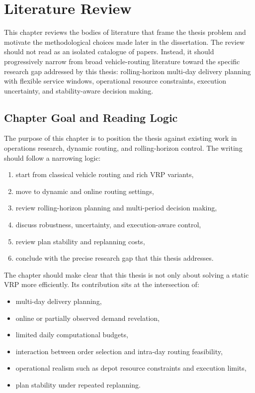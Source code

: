 \chapter{Literature Review}
\label{chap:literature_review}

This chapter reviews the bodies of literature that frame the thesis problem and motivate the methodological choices made later in the dissertation. The review should not read as an isolated catalogue of papers. Instead, it should progressively narrow from broad vehicle-routing literature toward the specific research gap addressed by this thesis: rolling-horizon multi-day delivery planning with flexible service windows, operational resource constraints, execution uncertainty, and stability-aware decision making.

\section{Chapter Goal and Reading Logic}

The purpose of this chapter is to position the thesis against existing work in operations research, dynamic routing, and rolling-horizon control. The writing should follow a narrowing logic:

\begin{enumerate}
    \item start from classical vehicle routing and rich VRP variants,
    \item move to dynamic and online routing settings,
    \item review rolling-horizon planning and multi-period decision making,
    \item discuss robustness, uncertainty, and execution-aware control,
    \item review plan stability and replanning costs,
    \item conclude with the precise research gap that this thesis addresses.
\end{enumerate}

The chapter should make clear that this thesis is not only about solving a static VRP more efficiently. Its contribution sits at the intersection of:

\begin{itemize}
    \item multi-day delivery planning,
    \item online or partially observed demand revelation,
    \item limited daily computational budgets,
    \item interaction between order selection and intra-day routing feasibility,
    \item operational realism such as depot resource constraints and execution limits,
    \item plan stability under repeated replanning.
\end{itemize}

